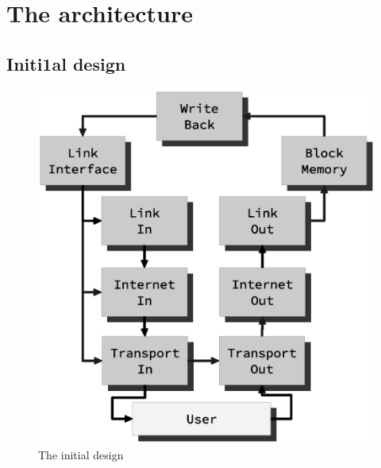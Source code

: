 \section{The architecture}
\subsection{Initi1al design}

\begin{figure}
    \includegraphics[scale=0.45]{design/design_0.eps}
    \caption{The initial design}
    \label{fig:initial_design}
\end{figure}

